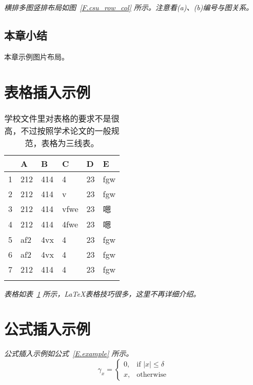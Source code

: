 \emph{横排多图竖排布局如图~\ref{F.csu_row_col} 所示。注意看(a)、(b)编号与图关系。}

\subsection{本章小结}
本章示例图片布局。

\newpage


\section{表格插入示例}

\begin{table}[htb]
  \centering
  \caption{学校文件里对表格的要求不是很高，不过按照学术论文的一般规范，表格为三线表。}
  \label{T.example}
  \begin{tabular}{llllll}
  \hline
   & A  & B  & C  & D  & E \\
  \hline
1 	& 212 & 414 & 4 		& 23 & fgw	\\
2 	& 212 & 414 & v 		& 23 & fgw	\\
3 	& 212 & 414 & vfwe		& 23 & 嗯	\\
4 	& 212 & 414 & 4fwe		& 23 & 嗯	\\
5 	& af2 & 4vx & 4 		& 23 & fgw	\\
6 	& af2 & 4vx & 4 		& 23 & fgw	\\
7 	& 212 & 414 & 4 		& 23 & fgw	\\

\hline{}
\end{tabular}
\end{table}

\emph{表格如表~\ref{T.example} 所示，\LaTeX 表格技巧很多，这里不再详细介绍。}

\lipsum

\newpage

\section{公式插入示例}

\lipsum

\emph{公式插入示例如公式~\eqref{E.example} 所示。}
\begin{equation}
\gamma_x=
\begin{cases}
  0, & \text{if $|x| \leq \delta$} \\
  x, & \text{otherwise}
\end{cases}
\label{E.example}
\end{equation}


